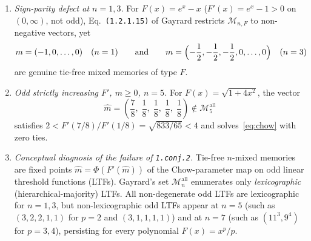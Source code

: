 \documentclass[11pt]{article}
\theoremstyle{definition}
\theoremstyle{remark}
\begin{document}
\begin{enumerate}[leftmargin=2em,itemsep=4pt]
  \item \emph{Sign-parity defect at $n = 1, 3$.} For $F(x) = e^x - x$ ($F'(x) = e^x - 1 > 0$ on $(0,\infty)$, not odd), Eq.~\texttt{(1.2.1.15)} of Gayrard restricts $\mathcal{M}_{n,F}$ to non-negative vectors, yet
  \[
    m = (-1, 0, \dots, 0) \quad (n=1)
    \qquad\text{and}\qquad
    m = \Bigl(-\frac{1}{2}, -\frac{1}{2}, -\frac{1}{2}, 0, \dots, 0\Bigr) \quad (n=3)
  \]
  are genuine tie-free mixed memories of type $F$.

  \item \emph{Odd strictly increasing $F'$, $m \ge 0$, $n = 5$.} For $F(x) = \sqrt{1 + 4x^2}$, the vector
  \[
    \hat{m} = \left(\frac{7}{8},\;\frac{1}{8},\;\frac{1}{8},\;\frac{1}{8},\;\frac{1}{8}\right) \notin \mathcal{M}_5^{\mathrm{all}}
  \]
  satisfies $2 < F'(7/8)/F'(1/8) = \sqrt{833/65} < 4$ and solves~\eqref{eq:chow} with zero ties.

  \item \emph{Conceptual diagnosis of the failure of \texttt{1.conj.2}.} Tie-free $n$-mixed memories are fixed points $\hat{m} = \Phi(F'(\hat{m}))$ of the Chow-parameter map on odd linear threshold functions (LTFs). Gayrard's set $\mathcal{M}_n^{\mathrm{all}}$ enumerates only \emph{lexicographic} (hierarchical-majority) LTFs. All non-degenerate odd LTFs are lexicographic for $n = 1, 3$, but non-lexicographic odd LTFs appear at $n = 5$ (such as $(3,2,2,1,1)$ for $p=2$ and $(3,1,1,1,1)$) and at $n = 7$ (such as $(11^3, 9^4)$ for $p = 3, 4$), persisting for every polynomial $F(x) = x^p/p$.
\end{enumerate}
\end{document}
